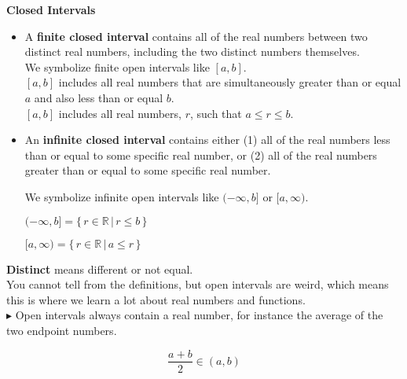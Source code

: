 \documentclass{ximera}
\begin{document}
\begin{definition}  \textbf{\textcolor{green!50!black}{Closed Intervals}} 



\begin{itemize}
\item A \textbf{finite closed interval} contains all of the real numbers between two distinct real numbers, including the two distinct numbers themselves.\\

We symbolize finite open intervals like $[a, b]$. \\
$[a,b]$ includes all real numbers that are simultaneously greater than or equal $a$ and also less than or equal $b$.  \\
$[a,b]$ includes all real numbers, $r$, such that $a \leq r \leq b$.



\item An \textbf{infinite closed interval} contains either (1) all of the real numbers less than or equal to some specific real number, or (2) all of the real numbers greater than or equal to some specific real number.

We symbolize infinite open intervals like $(-\infty, b]$ or $[a, \infty)$.


$(-\infty, b] = \{ \, r \in \mathbb{R} \, | \,  r \leq b  \,   \}$

$[a, \infty) = \{ \, r \in \mathbb{R} \, | \,  a \leq r   \,  \}$

\end{itemize}


\end{definition}
\textbf{Distinct} means different or not equal. \\









You cannot tell from the definitions, but open intervals are weird, which means this is where we learn a lot about real numbers and functions. \\


$\blacktriangleright$  Open intervals always contain a real number, for instance the average of the two endpoint numbers.



\[  \frac{a+b}{2}  \in (a,b)    \]
\end{document}
